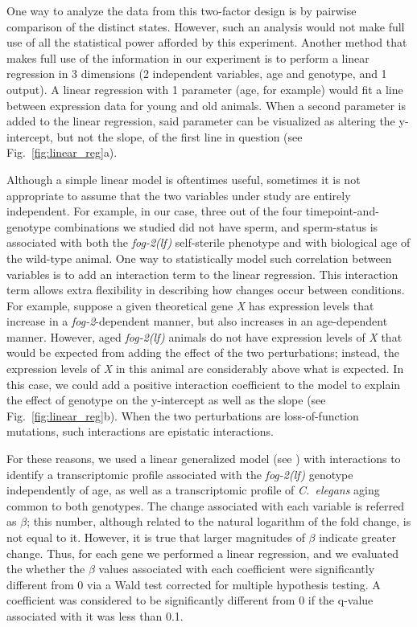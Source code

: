 \documentclass[10pt,letterpaper,twocolumn]{article}
\newcommand{\cel}{\emph{C.~elegans}}
\newcommand{\fog}{\emph{\mbox{fog-2(lf)}}}
\newcommand{\gene}[1]{\emph{\mbox{#1}}}
\begin{document}
One way to analyze the data from this two-factor design is by pairwise
comparison of the distinct states. However, such an analysis would not make full
use of all the statistical power afforded by this experiment. Another method
that makes full use of the information in our experiment is to perform a linear
regression in 3 dimensions (2 independent variables, age and genotype, and 1
output). A linear regression with 1 parameter (age, for example) would fit a
line between expression data for young and old animals. When a second parameter
is added to the linear regression, said parameter can be visualized as altering
the y-intercept, but not the slope, of the first line in question (see
Fig.~\ref{fig:linear_reg}a).

Although a simple linear model is oftentimes useful, sometimes it is not
appropriate to assume that the two variables under study are entirely
independent. For example, in our case, three out of the four timepoint-and-genotype
combinations we studied did not have sperm, and sperm-status is
associated with both the \fog{} self-sterile phenotype and with biological age
of the wild-type animal. One way to statistically model such correlation between
variables is to add an interaction term to the linear regression.
This interaction term allows extra flexibility in describing how changes occur
between conditions.
For example, suppose a given theoretical gene \gene{X} has expression levels that
increase in a \gene{fog-2}-dependent manner, but also increases in an
age-dependent manner. However, aged \fog{} animals do not have expression levels
of \gene{X} that would be expected from adding the effect of the two perturbations;
instead, the expression levels of \gene{X} in this animal are considerably above
what is expected. In this case, we could add a positive
interaction coefficient to the model to explain the effect of genotype on the
y-intercept as well as the slope (see Fig.~\ref{fig:linear_reg}b).
When the two
perturbations are loss-of-function mutations, such interactions are epistatic
interactions.

For these reasons, we used a linear generalized model (see )
with interactions to identify a transcriptomic profile associated with the
\fog{} genotype independently of age, as well as a transcriptomic profile of
\cel{} aging common to both genotypes. The change associated with each variable
is referred as $\beta$; this number, although related to the natural logarithm
of the fold change, is not equal to it. However, it is true that larger
magnitudes of $\beta$ indicate greater change. Thus, for each gene we performed
a linear regression, and we evaluated the whether the $\beta$ values associated
with each coefficient were significantly different from 0 via a Wald test
corrected for multiple hypothesis testing. A coefficient was considered to be
significantly different from 0 if the q-value associated with it was less than
0.1.
\end{document}
